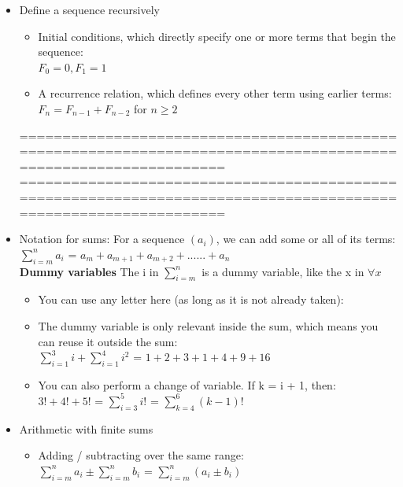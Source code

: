 \documentclass{article}
\begin{document}
\begin{itemize}
\item Define a sequence recursively
\begin{itemize}
\item Initial conditions, which directly specify one or more terms that begin
the sequence:\\
$F_0 = 0,F_1 = 1$\\
\item A recurrence relation, which defines every other term using earlier
terms:\\
$F_n = F_{n-1} + F_{n-2} $ for $n \geq 2$
\end{itemize}

================================================================================================================
\newpage
================================================================================================================
 \item Notation for sums:
 For a sequence $(a_i)$, we can add some or all of its terms:\\
 
$\sum_{i = m}^n a_i$ = $a_m + a_{m+1} + a_{m + 2} + ...... + a_n$\\

\textbf{Dummy variables}
The i in $\sum_{i = m}^n$ is a dummy variable, like the x in $\forall x$\\
\begin{itemize}
\item You can use any letter here (as long as it is not already taken):
\item The dummy variable is only relevant inside the sum, which means you can
reuse it outside the sum:\\
$\sum_{i = 1}^3 i + \sum_{i = 1}^4 i^2$ = $1+2+3+1+4+9+16$
\item You can also perform a change of variable. If k = i + 1, then:\\
$3! + 4! + 5!$ = $\sum_{i = 3}^5 i!$ = $\sum_{k = 4}^6 (k - 1)!$
\end{itemize}
 
 \item Arithmetic with finite sums
\begin{itemize}
\item Adding / subtracting over the same range:\\
$\sum_{i = m}^n a_i \pm \sum_{i = m}^n b_i$ = $\sum_{i = m}^n (a_i \pm b_i)$


\end{itemize}
\end{itemize}
\end{document}
